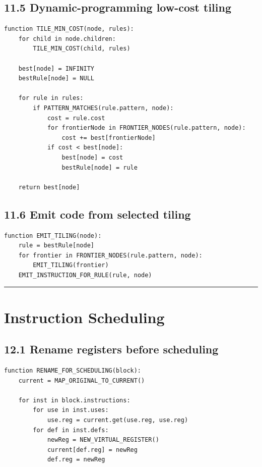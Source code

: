 \documentclass[10pt,letterpaper]{article}
\begin{document}
\subsection*{11.5 Dynamic-programming low-cost tiling}

\begin{verbatim}
function TILE_MIN_COST(node, rules):
    for child in node.children:
        TILE_MIN_COST(child, rules)

    best[node] = INFINITY
    bestRule[node] = NULL

    for rule in rules:
        if PATTERN_MATCHES(rule.pattern, node):
            cost = rule.cost
            for frontierNode in FRONTIER_NODES(rule.pattern, node):
                cost += best[frontierNode]
            if cost < best[node]:
                best[node] = cost
                bestRule[node] = rule

    return best[node]
\end{verbatim}

\subsection*{11.6 Emit code from selected tiling}

\begin{verbatim}
function EMIT_TILING(node):
    rule = bestRule[node]
    for frontier in FRONTIER_NODES(rule.pattern, node):
        EMIT_TILING(frontier)
    EMIT_INSTRUCTION_FOR_RULE(rule, node)
\end{verbatim}

\medskip\hrule\medskip

\clearpage
\section{Instruction Scheduling}

\subsection*{12.1 Rename registers before scheduling}

\begin{verbatim}
function RENAME_FOR_SCHEDULING(block):
    current = MAP_ORIGINAL_TO_CURRENT()

    for inst in block.instructions:
        for use in inst.uses:
            use.reg = current.get(use.reg, use.reg)
        for def in inst.defs:
            newReg = NEW_VIRTUAL_REGISTER()
            current[def.reg] = newReg
            def.reg = newReg
\end{verbatim}
\end{document}

